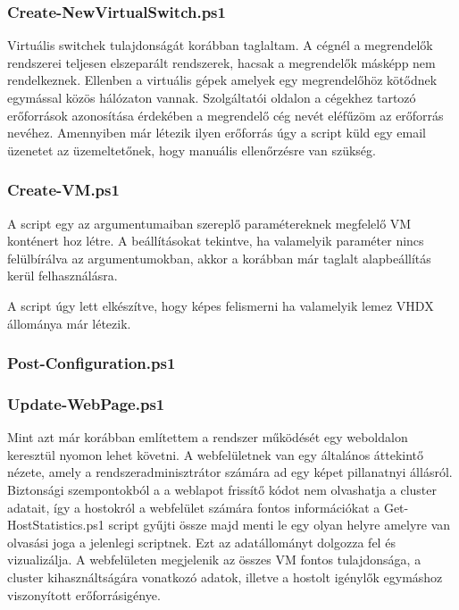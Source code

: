 \documentclass[12pt,oneside,justify,table]{book}
\begin{document}

\subsubsection{Create-NewVirtualSwitch.ps1}

Virtuális switchek tulajdonságát korábban taglaltam. A cégnél a megrendelők rendszerei teljesen elszeparált rendszerek, hacsak a megrendelők másképp nem rendelkeznek. Ellenben a virtuális gépek amelyek egy megrendelőhöz kötődnek egymással közös hálózaton vannak. Szolgáltatói oldalon a cégekhez tartozó erőforrások azonosítása érdekében a megrendelő cég nevét eléfűzöm az erőforrás nevéhez. Amennyiben már létezik ilyen erőforrás úgy a script küld egy email üzenetet az üzemeltetőnek, hogy manuális ellenőrzésre van szükség.

\subsubsection{Create-VM.ps1}

A script egy az argumentumaiban szereplő paramétereknek megfelelő VM konténert hoz létre. A beállításokat tekintve, ha valamelyik paraméter nincs felülbírálva az argumentumokban, akkor a korábban már taglalt alapbeállítás kerül felhasználásra.

A script úgy lett elkészítve, hogy képes felismerni ha valamelyik lemez VHDX állománya már létezik.

\subsubsection{Post-Configuration.ps1}

\subsubsection{Update-WebPage.ps1}
Mint azt már korábban említettem a rendszer működését egy weboldalon keresztül nyomon lehet követni. A webfelületnek van egy általános áttekintő nézete, amely a rendszeradminisztrátor számára ad egy képet pillanatnyi állásról. 
Biztonsági szempontokból a a weblapot frissítő kódot nem olvashatja a cluster adatait, így a hostokról a webfelület számára fontos információkat a Get-HostStatistics.ps1 script gyűjti össze majd menti le egy olyan helyre amelyre van olvasási joga a jelenlegi scriptnek. Ezt az adatállományt dolgozza fel és vizualizálja. A webfelületen megjelenik az összes VM fontos tulajdonsága, a cluster kihasználtságára vonatkozó adatok, illetve a hostolt igénylők egymáshoz viszonyított erőforrásigénye.
\end{document}
